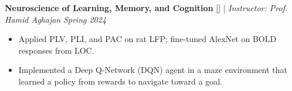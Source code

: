 \documentclass[11pt,a4paper,roman]{moderncv}        %
\begin{document}
    \vspace{2mm}
    \textbf{Neuroscience of Learning, Memory, and Cognition} \href{https://github.com/RadinKhayyam/Neuroscience_of_Learning_Memory_and_Cognition_Course}{\textcolor{blue link}{[\faGithub]}} $|$ \emph{Instructor: Prof. Hamid Aghajan} \hfill{\emph{Spring 2024}} 
    \vspace{2mm}
    \begin{itemize} \item Applied PLV, PLI, and PAC on rat LFP; fine-tuned AlexNet on BOLD responses from LOC.
    \item Implemented a Deep Q-Network (DQN) agent in a maze environment that learned a policy from rewards to navigate toward a goal. \end{itemize}



\end{document}
